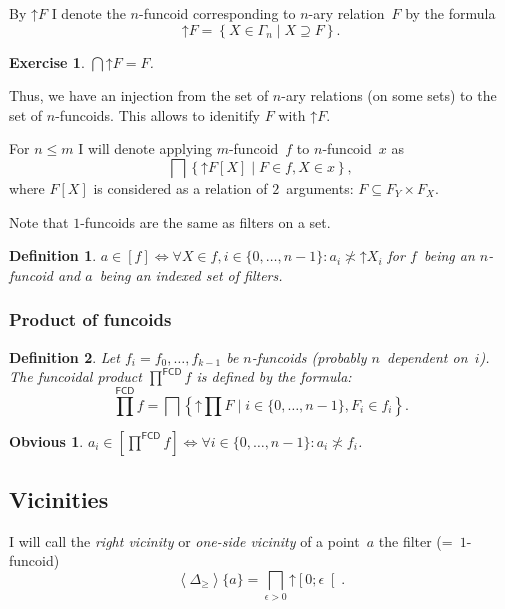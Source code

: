 \documentclass[oneside,draft]{amsart}
\newcommand{\setcond}[2]{\left\{#1\mid#2\right\}}
\newcommand{\intrs}{\not\asymp}
\newcommand{\funcoids}{\mathsf{FCD}}
\newcommand{\supfun}[1]{\left\langle#1\right\rangle}
\newcommand{\suprel}[1]{\left[#1\right]}
\newtheorem{obvious}{Obvious}
\newtheorem{defn}{Definition}
\newtheorem{exer}{Exercise}
\begin{document}
By $\mathord{\uparrow}F$ I denote the $n$-fun\-co\-id corresponding to $n$-ary relation~$F$ by the formula
\[ \mathord{\uparrow}F = \setcond{X\in\Gamma_n}{X\supseteq F}. \]

\begin{exer}
$\bigcap\mathord{\uparrow}F = F$.
\end{exer}

Thus, we have an injection from the set of $n$-ary relations (on some sets) to the set of $n$-fun\-co\-ids.
This allows to idenitify $F$ with $\mathord{\uparrow}F$.

For $n\leq m$ I will denote applying $m$-fun\-co\-id~$f$ to $n$-fun\-co\-id~$x$ as
\[ \bigsqcap\setcond{\mathord{\uparrow} F[X]}{F\in f,X\in x}, \]
where $F[X]$ is considered as a relation of $2$~arguments: $F\subseteq F_Y\times F_X$.

Note that $1$-fun\-co\-ids are the same as filters on a set.

\begin{defn}
$a\in\suprel{f} \Leftrightarrow \forall X\in f, i\in\{0,\dots,n-1\}: a_i \intrs \mathord{\uparrow}X_i$ for $f$~being an $n$-fun\-co\-id and $a$~being an indexed set of filters.
\end{defn}

\subsubsection{Product of funcoids}

\begin{defn}
Let $f_i = f_0,\dots,f_{k-1}$ be $n$-fun\-co\-ids (probably $n$~dependent on~$i$). The \emph{funcoidal product} $\prod^{\funcoids}f$ is defined by the formula:
\[
\prod^{\funcoids}f = \bigsqcap\setcond{\mathord{\uparrow}\prod F}{i\in\{0,\dots,n-1\}, F_i\in f_i}.
\]
\end{defn}

\begin{obvious}
$a_i\in\suprel{\prod^{\funcoids}f} \Leftrightarrow \forall i\in\{0,\dots,n-1\}: a_i\intrs f_i$.
\end{obvious}

\subsection{Vicinities}

I will call the \emph{right vicinity} or \emph{one-si\-de vicinity} of a point~$a$ the filter (=~$1$-fun\-co\-id)
\[ \supfun{\Delta_{\geq}}\{a\} = \bigsqcap_{\epsilon>0}\mathord{\uparrow}\left[0;\epsilon\right[. \]
\end{document}
